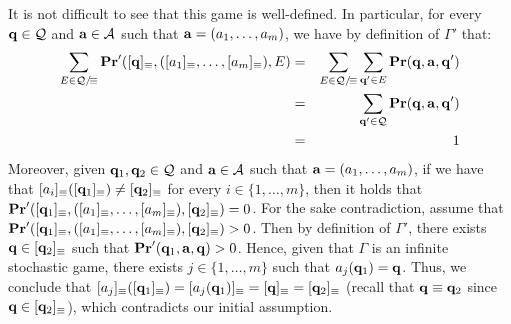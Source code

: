 It is not difficult to see that this game is well-defined. In particular, for every $\mathbf{q} \in \mathcal{Q}$ and $\mathbf{a} \in  \mathcal{A}$ such that $\mathbf{a} = (a_1, \ldots, a_m)$, we have by definition of $\Gamma'$ that:
\begin{eqnarray*}
\sum_{E \in \mathcal{Q}/\!\equiv} \mathbf{Pr}'([\mathbf{q}]_\equiv, ([a_1]_\equiv, \ldots, [a_m]_\equiv), E) & = & \sum_{E \in \mathcal{Q}/\!\equiv} \sum_{\mathbf{q}' \in E} \mathbf{Pr}(\mathbf{q}, \mathbf{a}, \mathbf{q}')\\
& = & \sum_{\mathbf{q}' \in \mathcal{Q}} \mathbf{Pr}(\mathbf{q}, \mathbf{a}, \mathbf{q}')\\
& = & 1
\end{eqnarray*}
Moreover, given $\mathbf{q}_1, \mathbf{q}_2 \in \mathcal{Q}$ and $\mathbf{a} \in \mathcal{A}$ such that $\mathbf{a} = (a_1, \ldots, a_m)$, if we have that $[a_i]_\equiv([\mathbf{q}_1]_\equiv) \neq [\mathbf{q}_2]_\equiv$ for every $i \in \{1, \ldots, m\}$, then it holds that $\mathbf{Pr}'([\mathbf{q}_1]_\equiv, ([a_1]_\equiv, \ldots, [a_m]_\equiv), [\mathbf{q}_2]_\equiv) = 0$. For the sake contradiction, assume that $\mathbf{Pr}'([\mathbf{q}_1]_\equiv, ([a_1]_\equiv, \ldots, [a_m]_\equiv), [\mathbf{q}_2]_\equiv) > 0$. Then by definition of $\Gamma'$, there exists $\mathbf{q} \in [\mathbf{q}_2]_\equiv$ such that $\mathbf{Pr}'(\mathbf{q}_1, \mathbf{a}, \mathbf{q}) > 0$. Hence, given that 
$\Gamma$ is an infinite stochastic game, there exists $j \in \{1, \ldots, m\}$ such that $a_j(\mathbf{q}_1) = \mathbf{q}$. Thus, we conclude that $[a_j]_\equiv([\mathbf{q}_1]_\equiv) = [a_j(\mathbf{q}_1)]_\equiv = [\mathbf{q}]_\equiv = [\mathbf{q}_2]_\equiv$ (recall that $\mathbf{q} \equiv \mathbf{q}_2$ since $\mathbf{q} \in [\mathbf{q}_2]_\equiv$), which contradicts our initial assumption. 


